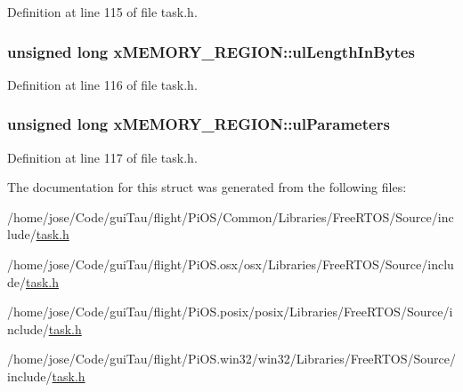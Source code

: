 Definition at line 115 of file task.\-h.

\hypertarget{structx_m_e_m_o_r_y___r_e_g_i_o_n_ac296475c5bdf95765db1786789e3aa4d}{
\subsubsection[{ul\-Length\-In\-Bytes}]{\setlength{\rightskip}{0pt plus 5cm}unsigned long x\-M\-E\-M\-O\-R\-Y\-\_\-\-R\-E\-G\-I\-O\-N\-::ul\-Length\-In\-Bytes}}\label{structx_m_e_m_o_r_y___r_e_g_i_o_n_ac296475c5bdf95765db1786789e3aa4d}


Definition at line 116 of file task.\-h.

\hypertarget{structx_m_e_m_o_r_y___r_e_g_i_o_n_a8750b0cad9c8b2c602ca9f0f2342b3aa}{
\subsubsection[{ul\-Parameters}]{\setlength{\rightskip}{0pt plus 5cm}unsigned long x\-M\-E\-M\-O\-R\-Y\-\_\-\-R\-E\-G\-I\-O\-N\-::ul\-Parameters}}\label{structx_m_e_m_o_r_y___r_e_g_i_o_n_a8750b0cad9c8b2c602ca9f0f2342b3aa}


Definition at line 117 of file task.\-h.



The documentation for this struct was generated from the following files\-:\begin{DoxyCompactItemize}
\item 
/home/jose/\-Code/gui\-Tau/flight/\-Pi\-O\-S/\-Common/\-Libraries/\-Free\-R\-T\-O\-S/\-Source/include/\hyperlink{_common_2_libraries_2_free_r_t_o_s_2_source_2include_2task_8h}{task.\-h}\item 
/home/jose/\-Code/gui\-Tau/flight/\-Pi\-O\-S.\-osx/osx/\-Libraries/\-Free\-R\-T\-O\-S/\-Source/include/\hyperlink{osx_2osx_2_libraries_2_free_r_t_o_s_2_source_2include_2task_8h}{task.\-h}\item 
/home/jose/\-Code/gui\-Tau/flight/\-Pi\-O\-S.\-posix/posix/\-Libraries/\-Free\-R\-T\-O\-S/\-Source/include/\hyperlink{posix_2posix_2_libraries_2_free_r_t_o_s_2_source_2include_2task_8h}{task.\-h}\item 
/home/jose/\-Code/gui\-Tau/flight/\-Pi\-O\-S.\-win32/win32/\-Libraries/\-Free\-R\-T\-O\-S/\-Source/include/\hyperlink{win32_2win32_2_libraries_2_free_r_t_o_s_2_source_2include_2task_8h}{task.\-h}\end{DoxyCompactItemize}
